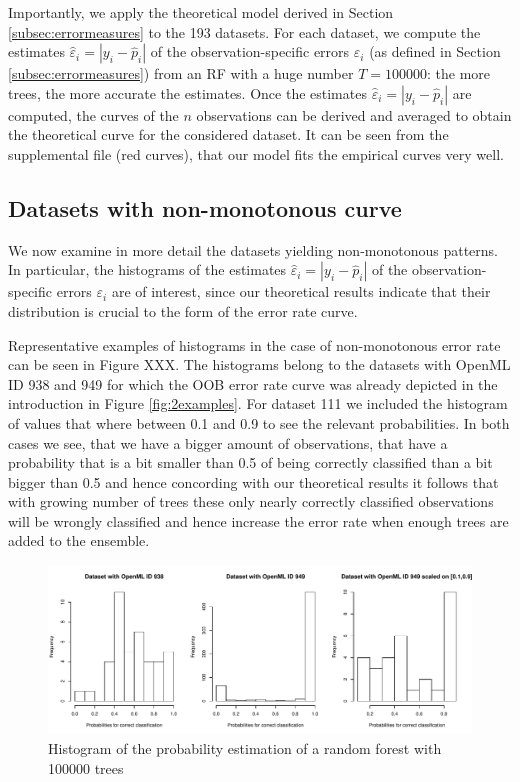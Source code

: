 \documentclass[paper=a4
               ,12pt
               ,DIV=12
               ,parskip=half
               ,titlepage=on
               ,headinclude 
               ,footinclude
               ,headsepline
               ,footsepline         %
               ,ilines 
               ]{scrartcl}
\begin{document}
Importantly, we apply the theoretical model derived in Section \ref{subsec:errormeasures} to the 193 datasets. For each dataset, we compute the estimates $\hat{\varepsilon}_i=|y_i-\hat{p}_i|$  of the observation-specific errors $\varepsilon_i$ (as defined in Section \ref{subsec:errormeasures}) from an RF with a huge number $T=100000$: the more trees, the more accurate the estimates. Once the estimates $\hat{\varepsilon}_i=|y_i-\hat{p}_i|$ are computed, the curves of the $n$ observations can be derived and averaged to obtain the theoretical curve for the considered dataset.
It can be seen from the supplemental file (red curves), that our model fits the empirical curves very well.


\subsection{Datasets with non-monotonous curve}
We now examine in more detail the datasets yielding non-monotonous patterns. In particular, the histograms of the estimates $\hat{\varepsilon}_i=|y_i-\hat{p}_i|$ of the observation-specific errors $\varepsilon_i$  are of interest, since our theoretical results indicate that their distribution is crucial to the form of the error rate curve. 

Representative examples of histograms in the case of non-monotonous error rate can be seen in Figure XXX. The histograms belong to the datasets with OpenML ID 938 and 949 for which the OOB error rate curve was already depicted in the introduction in Figure \ref{fig:2examples}. 
For dataset 111 we included the histogram of values that where between 0.1 and 0.9 to see the relevant probabilities. In both cases we see, that we have a bigger amount of observations, that have a probability that is a bit smaller than 0.5
of being correctly classified than a bit bigger than 0.5 and hence concording with our theoretical results it follows that with growing number of trees these only nearly correctly classified observations will be wrongly classified and hence 
increase the error rate when enough trees are added to the ensemble. 

\begin{figure}[!htb]
\begin{center}
  \includegraphics[width=\textwidth]{histogram.pdf}
  \caption{Histogram of the probability estimation of a random forest with 100000 trees}
\end{center}
\end{figure}
\end{document}
